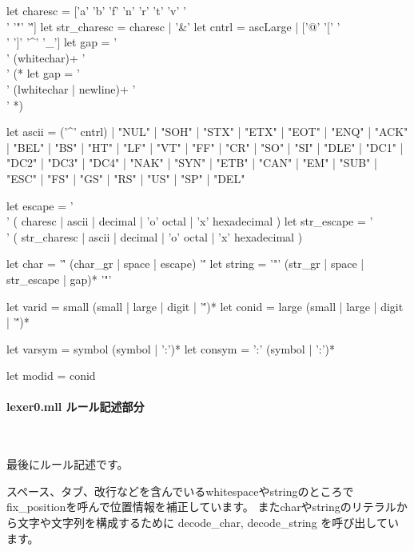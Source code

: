 \documentclass[mingoth,a4paper]{jsarticle}
\begin{document}
\begin{commandline}
let charesc = ['a' 'b' 'f' 'n' 'r' 't' 'v' '\\' '"' '\'']
let str_charesc = charesc | '&'
let cntrl = ascLarge | ['@' '[' '\\' ']' '^' '_']
let gap = '\\' (whitechar)+ '\\'
(* let gap = '\\' (lwhitechar | newline)+ '\\' *)

let ascii = ('^' cntrl) | "NUL" | "SOH" | "STX" | "ETX" | "EOT" | "ENQ" | "ACK"
  | "BEL" | "BS" | "HT" | "LF" | "VT" | "FF" | "CR" | "SO" | "SI" | "DLE"
  | "DC1" | "DC2" | "DC3" | "DC4" | "NAK" | "SYN" | "ETB" | "CAN"
  | "EM" | "SUB" | "ESC" | "FS" | "GS" | "RS" | "US" | "SP" | "DEL"

let escape = '\\' ( charesc | ascii | decimal | 'o' octal | 'x' hexadecimal )
let str_escape = '\\' ( str_charesc | ascii | decimal | 'o' octal | 'x' hexadecimal )

let char = '\'' (char_gr | space | escape) '\''
let string = '"' (str_gr | space | str_escape | gap)* '"'

let varid = small (small | large | digit | '\'')*
let conid = large (small | large | digit | '\'')*

let varsym = symbol (symbol | ':')*
let consym = ':' (symbol | ':')*

let modid = conid
\end{commandline}


\pagebreak

\paragraph{lexer0.mll ルール記述部分} \ 

最後にルール記述です。

スペース、タブ、改行などを含んでいるwhitespaceやstringのところで
fix\_positionを呼んで位置情報を補正しています。
またcharやstringのリテラルから文字や文字列を構成するために
decode\_char, decode\_string を呼び出しています。
\end{document}
